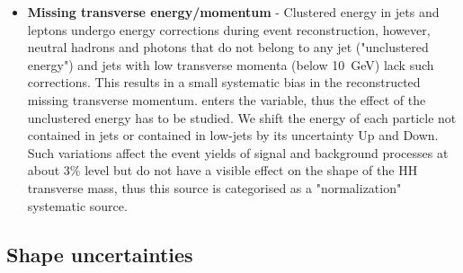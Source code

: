 \begin{itemize}

%

\item{\bfseries Missing transverse energy/momentum} - Clustered energy in
  jets and leptons undergo energy corrections during event
  reconstruction, however, neutral hadrons and photons that do not belong to any jet
  ("unclustered energy") and jets with low transverse momenta (below
  10~GeV) lack such corrections. This results in a small systematic
  bias in the reconstructed missing transverse momentum. \ETslash enters the \mTHH variable, thus the effect of the unclustered energy has to be studied. We shift the energy of each
  particle not contained in jets or contained in low-\pt jets by its
  uncertainty Up and Down. Such variations affect the event yields of signal and background processes at about
  3\% level but do not have a visible effect on the shape of the HH
  transverse mass, thus this source is categorised as a
  "normalization" systematic source.

\end{itemize}



\subsection{Shape uncertainties}

